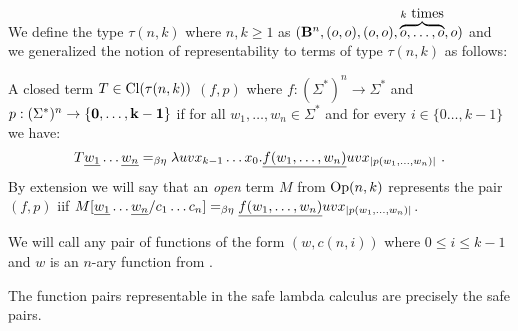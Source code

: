 We define the type $\tau(n,k)$ where $n, k\geq1$ as
$(\mathbf{B}^n,(o,o),(o,o),\overbrace{o,\ldots,o}^{k\hbox{
times}},o)$ and we generalized the notion of representability to
terms of type $\tau(n,k)$ as follows:
\begin{definition}
A closed term $T\in{\rm Cl}(\tau(n,k))$ 
$(f,p)$ where $f:(\Sigma^*)^n \rightarrow \Sigma^*$ and $p:(\Sigma^*)^n \rightarrow \{\mathbf{0}, \ldots, \mathbf{k-1}\}$ if for all $w_1,\ldots,w_n\in\Sigma^*$
and for every $i\in \{0\ldots,k-1\}$ we have:
$$
T \zaioncencode{w_1} \ldots \zaioncencode{w_n} =_{\beta\eta} \lambda u v x_{k-1}\ldots x_0 . \zaioncencode{f(w_1,\ldots,w_n)} u v x_{|p(w_1,\ldots,w_n)|} \ .
$$
By extension we will say that an \emph{open} term $M$ from ${\rm Op}(n,k)$
represents the pair $(f,p)$
iif $M[\underline{w_1}\ldots \underline{w_n}/c_1\ldots c_n] =_{\beta\eta} \underline{f(w_1,\ldots,w_n)} u v x_{|p(w_1,\ldots,w_n)|}$.
\end{definition}

We will call  any pair of functions of the form
$(w,c(n,i))$ where $0\leq i\leq k-1$ and $w$ is an $n$-ary function
from \safedefset.

\begin{theorem}
\label{thm:zaionc_pair_characterization_safe} The function pairs
representable in the safe lambda calculus are precisely the safe
pairs.
\end{theorem}

